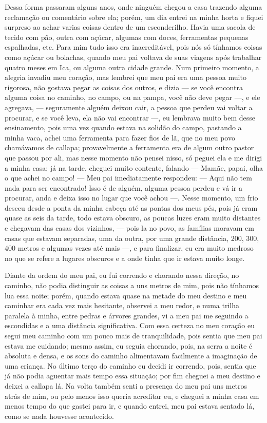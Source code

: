 Dessa forma passaram alguns anos, onde ninguém chegou a casa trazendo alguma reclamação ou comentário sobre ela; porém, um dia entrei na minha horta e  fiquei surpreso ao achar varias coisas dentro de um esconderilho. Havia uma sacola de tecido com pão, outra com açúcar, algumas com doces, ferramentas pequenas espalhadas, etc. 
Para mim tudo isso era inacreditável, pois nós só tínhamos coisas como açúcar ou bolachas, quando meu pai voltava de suas viagens após trabalhar quatro meses em Ica, ou alguma outra cidade grande.
Num primeiro momento, a alegria invadiu meu coração, mas lembrei que meu pai era uma pessoa muito rigorosa, não gostava pegar as coisas dos outros, e dizia --- se você encontra alguma coisa no caminho, no campo, ou na pampa, você não deve pegar ---, e ele agregava, --- seguramente alguém deixou cair, a pessoa que perdeu vai voltar a procurar, e se você leva, ela não vai encontrar ---, 
eu lembrava muito bem desse ensinamento, pois uma vez quando estava na solidão do campo, pastando a minha vaca, achei uma ferramenta para fazer fios de lã, que no meu povo chamávamos de callapa; provavelmente a ferramenta era de algum outro pastor que passou por ali, mas nesse momento não pensei nisso, só peguei ela e me dirigi a minha casa; já na tarde, cheguei  muito contente, falando --- Mamãe, papai, olha o que achei no campo! --- 
Meu pai imediatamente respondeu: --- Aqui não tem nada para ser encontrado! Isso é de alguém, alguma pessoa perdeu e vá ir a procurar, anda e deixa isso no lugar que você achou ---. 
Nesse momento, um frio desceu desde a ponta da minha cabeça até as pontas dos meus pés, pois já eram quase as seis da tarde, todo estava obscuro, as poucas luzes eram muito distantes e chegavam das casas dos vizinhos, --- pois la no povo, as famílias moravam em casas que estavam separadas, uma da outra, por uma grande distância, 200, 300, 400 metros e algumas vezes até mais  ---, e para finalizar, eu era muito medroso no que se refere a lugares obscuros e a onde tinha que ir estava muito longe.

Diante da ordem do meu pai, eu fui correndo e chorando nessa direção, no caminho, não podia distinguir as coisas a uns metros de mim, pois não tínhamos lua essa noite; porém, quando estava quase na metade do meu destino e meu caminhar era cada vez mais hesitante, observei a meu redor, e numa trilha paralela à minha, entre pedras e árvores grandes, vi a meu pai me seguindo a escondidas e a uma distância significativa.
Com essa certeza no meu coração eu segui meu caminho com um pouco mais de tranquilidade, pois sentia que meu pai estava me cuidando; mesmo assim, eu seguia chorando, pois, na serra a noite é absoluta e densa, e os sons do caminho alimentavam facilmente a imaginação de uma criança.
No último terço do caminho eu decidi ir correndo, pois, sentia que já não podia aguentar mais tempo essa situação; por fim cheguei a meu destino e deixei a callapa lá.
Na volta também senti a presença do meu pai uns metros atrás de mim, ou pelo menos isso queria acreditar eu, e cheguei a minha casa em menos tempo do que gastei para ir, e quando entrei, meu pai estava sentado lá, como se nada houvesse acontecido.


